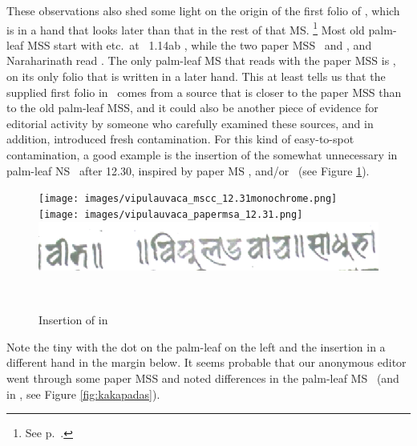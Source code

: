 \label{msCcfirstfoliokakapada}
These observations also shed some light on
the origin of the first folio of \msCc, which is in 
a hand that looks later than that in the rest of that MS.%
		\footnote{See p.~\pageref{msCcfirstfolio}.}			 
Most old palm-leaf MSS start with 
etc.\ at \VSS\ 1.14ab , while the two 
paper MSS \msPaperA\ and \msPaperC, 
and Naraharinath read . The only palm-leaf MS that reads with 
the paper MSS is \msCc, on its only folio that is
written in a later hand. This at least tells us that
the supplied first folio in \msCc\ comes from a
source that is closer to the paper MSS than to the
old palm-leaf MSS, and it could also be another piece
of evidence for editorial activity by someone who
carefully examined these sources, and in addition,
introduced fresh contamination. \label{vipulauvaca}For this kind
of easy-to-spot contamination, a good example is
the insertion of the somewhat unnecessary
 in palm-leaf NS \msCc\ after 12.30,
inspired by paper MS \msPaperA, 
and/or \msPaperC\ (see Figure \ref{fig:vipulauvaca}).
\begin{figure} 
\hfill
\texttt{[image: images/vipulauvaca\_mscc\_12.31monochrome.png]}
\hfill
\texttt{[image: images/vipulauvaca\_papermsa\_12.31.png]}
\hfill
\includegraphics[scale=.2]{images/vipulauvaca_msPaperC223v.png}
\hfill

\hspace{2em}
\msCc\ \verso
\hspace{5em}
\msPaperA\ \recto
\hspace{6em}
\msPaperC\ \verso
\hspace{3em}
\caption{Insertion of  in \msCc\label{fig:vipulauvaca}}
\end{figure}
Note the tiny  with the dot
on the palm-leaf on the left and
the insertion in a different hand in the margin below.
It seems probable that our anonymous editor
went through some paper MSS and noted differences
in the palm-leaf MS \msCc\ (and in \msNa, see Figure
\ref{fig:kakapadas}). 

\medskip

